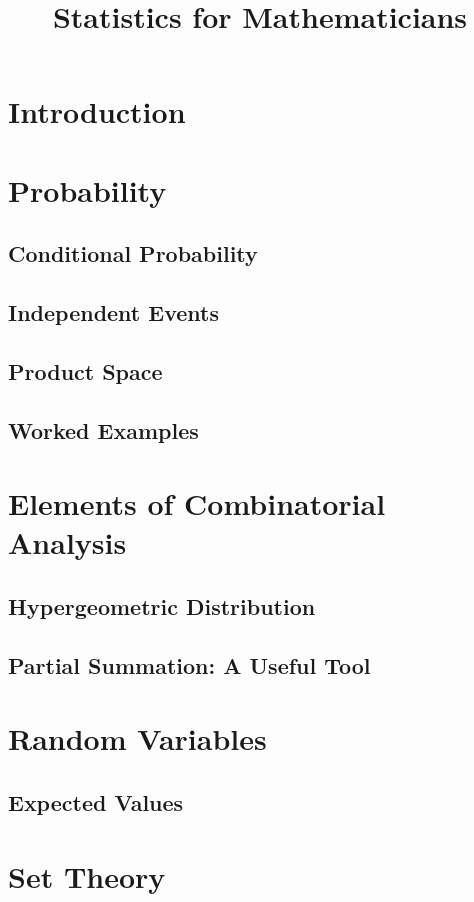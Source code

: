 \documentclass[oneside]{report}
\title{Statistics for Mathematicians}
\begin{document}
\maketitle
\tableofcontents

\chapter{Introduction}


\chapter{Probability}

\section{Conditional Probability}

\section{Independent Events}

\section{Product Space} 


\section{Worked Examples}


\chapter{Elements of Combinatorial Analysis}

\section{Hypergeometric Distribution}

\section[Partial Summation]{Partial Summation: A Useful Tool}


\chapter{Random Variables}

\section{Expected Values}


\vfill\eject
\appendix
\chapter{Set Theory}


\end{document}
